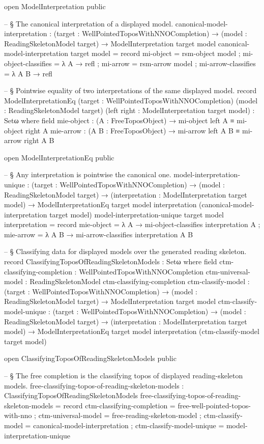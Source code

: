 \documentclass[11pt]{article}
\begin{document}
\begin{code}
open ModelInterpretation public

-- § The canonical interpretation of a displayed model.
canonical-model-interpretation :
  (target : WellPointedToposWithNNOCompletion) →
  (model : ReadingSkeletonModel target) →
  ModelInterpretation target model
canonical-model-interpretation target model = record
  { mi-object = rsm-object model
  ; mi-object-classifies = λ A → refl
  ; mi-arrow = rsm-arrow model
  ; mi-arrow-classifies = λ A B → refl
  }

-- § Pointwise equality of two interpretations of the same displayed model.
record ModelInterpretationEq
  (target : WellPointedToposWithNNOCompletion)
  (model : ReadingSkeletonModel target)
  (left right : ModelInterpretation target model) : Setω where
  field
    mie-object :
      (A : FreeToposObject) →
      mi-object left A ≡ mi-object right A
    mie-arrow :
      (A B : FreeToposObject) →
      mi-arrow left A B ≡ mi-arrow right A B

open ModelInterpretationEq public

-- § Any interpretation is pointwise the canonical one.
model-interpretation-unique :
  (target : WellPointedToposWithNNOCompletion) →
  (model : ReadingSkeletonModel target) →
  (interpretation : ModelInterpretation target model) →
  ModelInterpretationEq
    target
    model
    interpretation
    (canonical-model-interpretation target model)
model-interpretation-unique target model interpretation = record
  { mie-object = λ A → mi-object-classifies interpretation A
  ; mie-arrow = λ A B → mi-arrow-classifies interpretation A B
  }

-- § Classifying data for displayed models over the generated reading skeleton.
record ClassifyingToposOfReadingSkeletonModels : Setω where
  field
    ctm-classifying-completion : WellPointedToposWithNNOCompletion
    ctm-universal-model : ReadingSkeletonModel ctm-classifying-completion
    ctm-classify-model :
      (target : WellPointedToposWithNNOCompletion) →
      (model : ReadingSkeletonModel target) →
      ModelInterpretation target model
    ctm-classify-model-unique :
      (target : WellPointedToposWithNNOCompletion) →
      (model : ReadingSkeletonModel target) →
      (interpretation : ModelInterpretation target model) →
      ModelInterpretationEq
        target
        model
        interpretation
        (ctm-classify-model target model)

open ClassifyingToposOfReadingSkeletonModels public

-- § The free completion is the classifying topos of displayed reading-skeleton models.
free-classifying-topos-of-reading-skeleton-models :
  ClassifyingToposOfReadingSkeletonModels
free-classifying-topos-of-reading-skeleton-models = record
  { ctm-classifying-completion = free-well-pointed-topos-with-nno
  ; ctm-universal-model = free-reading-skeleton-model
  ; ctm-classify-model = canonical-model-interpretation
  ; ctm-classify-model-unique = model-interpretation-unique
  }
\end{code}
\end{document}

